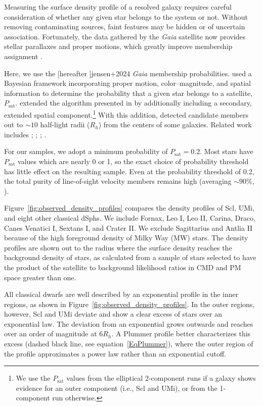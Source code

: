 \documentclass[times,trackchanges, twocolumn, twocolappendix]{aastex701}
\makeatletter
\newcommand{\jj}{\citetalias{jensen+2024}}
\DeclareRobustCommand\citepos
  {\begingroup
   \let\NAT@nmfmt\NAT@posfmt%
   \NAT@swafalse\let\NAT@ctype\z@\NAT@partrue
   \@ifstar{\NAT@fulltrue\NAT@citetp}{\NAT@fullfalse\NAT@citetp}}
\let\NAT@orig@nmfmt\NAT@nmfmt
\def\NAT@posfmt#1{\NAT@orig@nmfmt{#1's}}
\makeatother
\begin{document}
Measuring the surface density profile of a resolved galaxy requires careful
consideration of whether any given star belongs to the system or not.
Without removing contaminating sources, faint
features may be hidden or of uncertain association. Fortunately, the data gathered by the \textit{Gaia} satellite now provides stellar parallaxes and proper motions, which greatly improve  membership assignment \citep{gaiacollaboration+2023}.

Here, we use the \citepos[hereafter \jj]{jensen+2024} \textit{Gaia} membership
probabilities. \jj{} used a Bayesian framework
incorporating proper motion, color--magnitude, and
spatial information to determine the probability that a given star
belongs to a satellite, $P_\text{sat}$. \jj{} extended
the algorithm presented in \citet{MV2020a, MV2020b} by additionally
including a secondary, extended spatial component.\footnote{
    We use
    the $P_\textrm{sat}$ values from the elliptical 2-component runs if a
    galaxy shows evidence for an outer component (i.e., Scl and UMi), or from the 1-component run
    otherwise. 
}
With this addition, \jj{} detected
candidate members out to ${\sim}10$ half-light radii ($R_h$) from the
centers of some galaxies. Related work includes
\citet{pace+li2019}; \citet{battaglia+2022}; \citet{pace+erkal+li2022};
\citet{qi+2022}.


For our samples, we adopt a minimum probability of
$P_\text{sat} = 0.2$. Most stars have $P_\text{sat}$ values which are nearly 0 or 1, so the exact choice of probability threshold has little effect on the resulting sample. Even
at the probability threshold of 0.2, the total purity of line-of-sight velocity members remains
high (averaging ${\sim}90\%$, \jj{}).

Figure~\ref{fig:observed_density_profiles} compares the density
profiles of Scl, UMi, and eight other classical dSphs. We include Fornax, Leo I, Leo II, Carina, Draco,
Canes Venatici I, Sextans I, and Crater II. We exclude Sagittarius and
Antlia II because of the high foreground density of Milky Way (MW) stars.
The density profiles are shown out to the radius where the surface density reaches the background density of stars, as calculated from a sample of stars selected to have the product of the satellite to background likelihood ratios in CMD and PM space greater than one.

All classical dwarfs are well described by an exponential profile in the inner regions, as shown in Figure~\ref{fig:observed_density_profiles}.
In the outer regions, however, Scl and UMi deviate and show a clear  excess of stars over an exponential law. The deviation from an exponential grows outwards and  reaches over an order of magnitude at $6 R_h$. A Plummer profile better characterizes this excess (dashed black line, see equation~\ref{EqPlummer}), where the outer region of the profile approximates a power law rather than an exponential cutoff. 
\end{document}
